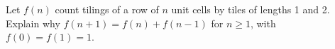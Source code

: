 Let $f(n)$ count tilings of a row of $n$ unit cells by tiles of lengths 1 and 2. Explain why $f(n+1)=f(n)+f(n-1)$ for $n\ge1$, with $f(0)=f(1)=1$.
